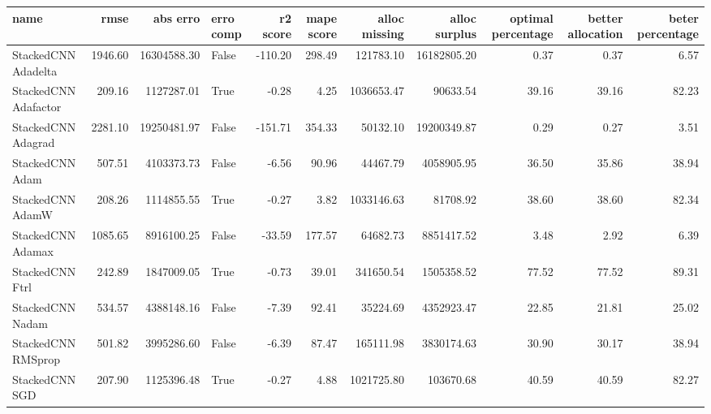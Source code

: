 \begin{tabular}{lrrlrrrrrrr}
\toprule
name & rmse & abs erro & erro comp & r2 score & mape score & alloc missing & alloc surplus & optimal percentage & better allocation & beter percentage \\
\midrule
StackedCNN Adadelta & 1946.60 & 16304588.30 & False & -110.20 & 298.49 & 121783.10 & 16182805.20 & 0.37 & 0.37 & 6.57 \\
StackedCNN Adafactor & 209.16 & 1127287.01 & True & -0.28 & 4.25 & 1036653.47 & 90633.54 & 39.16 & 39.16 & 82.23 \\
StackedCNN Adagrad & 2281.10 & 19250481.97 & False & -151.71 & 354.33 & 50132.10 & 19200349.87 & 0.29 & 0.27 & 3.51 \\
StackedCNN Adam & 507.51 & 4103373.73 & False & -6.56 & 90.96 & 44467.79 & 4058905.95 & 36.50 & 35.86 & 38.94 \\
StackedCNN AdamW & 208.26 & 1114855.55 & True & -0.27 & 3.82 & 1033146.63 & 81708.92 & 38.60 & 38.60 & 82.34 \\
StackedCNN Adamax & 1085.65 & 8916100.25 & False & -33.59 & 177.57 & 64682.73 & 8851417.52 & 3.48 & 2.92 & 6.39 \\
StackedCNN Ftrl & 242.89 & 1847009.05 & True & -0.73 & 39.01 & 341650.54 & 1505358.52 & 77.52 & 77.52 & 89.31 \\
StackedCNN Nadam & 534.57 & 4388148.16 & False & -7.39 & 92.41 & 35224.69 & 4352923.47 & 22.85 & 21.81 & 25.02 \\
StackedCNN RMSprop & 501.82 & 3995286.60 & False & -6.39 & 87.47 & 165111.98 & 3830174.63 & 30.90 & 30.17 & 38.94 \\
StackedCNN SGD & 207.90 & 1125396.48 & True & -0.27 & 4.88 & 1021725.80 & 103670.68 & 40.59 & 40.59 & 82.27 \\
\bottomrule
\end{tabular}
